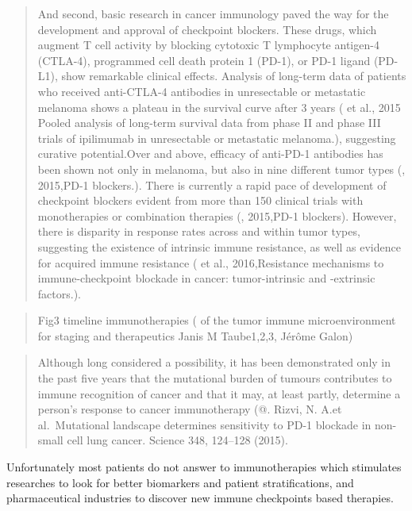\documentclass[12pt,]{book}
\theoremstyle{definition}
\theoremstyle{definition}
\theoremstyle{definition}
\theoremstyle{remark}
\begin{document}
\begin{quote}
And second, basic research in cancer immunology paved the way for the
development and approval of checkpoint blockers. These drugs, which
augment T cell activity by blocking cytotoxic T lymphocyte antigen-4
(CTLA-4), programmed cell death protein 1 (PD-1), or PD-1 ligand
(PD-L1), show remarkable clinical effects. Analysis of long-term data of
patients who received anti-CTLA-4 antibodies in unresectable or
metastatic melanoma shows a plateau in the survival curve after 3 years
(\citet{Schadendorf} et al., 2015 Pooled analysis of long-term survival
data from phase II and phase III trials of ipilimumab in unresectable or
metastatic melanoma.), suggesting curative potential.Over and above,
efficacy of anti-PD-1 antibodies has been shown not only in melanoma,
but also in nine different tumor types (\citet{Wolchok}, 2015,PD-1
blockers.). There is currently a rapid pace of development of checkpoint
blockers evident from more than 150 clinical trials with monotherapies
or combination therapies (\citet{Wolchok}, 2015,PD-1 blockers). However,
there is disparity in response rates across and within tumor types,
suggesting the existence of intrinsic immune resistance, as well as
evidence for acquired immune resistance (\citet{Pitt} et al.,
2016,Resistance mechanisms to immune-checkpoint blockade in cancer:
tumor-intrinsic and -extrinsic factors.).
\end{quote}

\begin{quote}
Fig3 timeline immunotherapies (\citet{Implications} of the tumor immune
microenvironment for staging and therapeutics Janis M Taube1,2,3, Jérôme
Galon)
\end{quote}

\begin{quote}
Although long considered a possibility, it has been demonstrated only in
the past five years that the mutational burden of tumours contributes to
immune recognition of cancer and that it may, at least partly, determine
a person's response to cancer immunotherapy (@. Rizvi, N. A.et
al.~Mutational landscape determines sensitivity to PD-1 blockade in
non-small cell lung cancer. Science 348, 124--128 (2015).
\end{quote}

Unfortunately most patients do not answer to immunotherapies which
stimulates researches to look for better biomarkers and patient
stratifications, and pharmaceutical industries to discover new immune
checkpoints based therapies.
\end{document}
